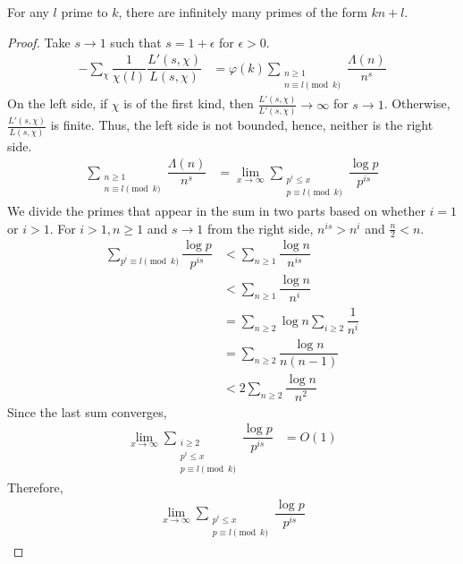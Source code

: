 \documentclass[elemannt.tex]{subfile}
\begin{document}
		\begin{theorem}\label{thm:dirichletprime}
			For any $l$ prime to $k$, there are infinitely many primes of the form $kn+l$.
		\end{theorem}

		\begin{proof}
			Take $s\to1$ such that $s=1+\epsilon$ for $\epsilon>0$.
				\begin{align*}
					-\sum_{\chi}\dfrac{1}{\chi(l)}\dfrac{L'(s, \chi)}{L(s, \chi)}
						& = \varphi(k)\sum_{\substack{n\geq1\\n\equiv l\pmod{k}}}\dfrac{\Lambda(n)}{n^{s}}
				\end{align*}
			On the left side, if $\chi$ is of the first kind, then $\frac{L'(s, \chi)}{L'(s, \chi)}\to\infty$ for $s\to1$. Otherwise, $\frac{L'(s, \chi)}{L(s, \chi)}$ is finite. Thus, the left side is not bounded, hence, neither is the right side.
				\begin{align*}
					\sum_{\substack{n\geq1\\n\equiv l\pmod{k}}}\dfrac{\Lambda(n)}{n^{s}}
						& = \lim_{x\to\infty}\sum_{\substack{p^{i}\leq x\\p\equiv l\pmod{k}}}\dfrac{\log{p}}{p^{is}}
				\end{align*}
			We divide the primes that appear in the sum in two parts based on whether $i=1$ or $i>1$. For $i>1, n\geq1$ and $s\to1$ from the right side, $n^{is}>n^{i}$ and $\frac{n}{2}<n$.
				\begin{align*}
					\sum_{p^{i}\equiv l\pmod{k}}\dfrac{\log{p}}{p^{is}}
						& < \sum_{n\geq1}\dfrac{\log{n}}{n^{is}}\\
						& < \sum_{n\geq 1}\dfrac{\log{n}}{n^{i}}\\
						& = \sum_{n\geq2}\log{n}\sum_{i\geq2}\dfrac{1}{n^{i}}\\
						& = \sum_{n\geq 2}\dfrac{\log{n}}{n(n-1)}\\
						& < 2\sum_{n\geq 2}\dfrac{\log{n}}{n^{2}}
				\end{align*}
			Since the last sum converges,
				\begin{align*}
					\lim_{x\to\infty}\sum_{\substack{i\geq 2\\p^{i}\leq x\\p\equiv l\pmod{k}}}\dfrac{\log{p}}{p^{is}}
						& = O(1)
				\end{align*}
			Therefore,
				\begin{align*}
					\lim_{x\to\infty}\sum_{\substack{p^{i}\leq x\\p\equiv l\pmod{k}}}\dfrac{\log{p}}{p^{is}}

\end{align*}
\end{proof}
\end{document}
